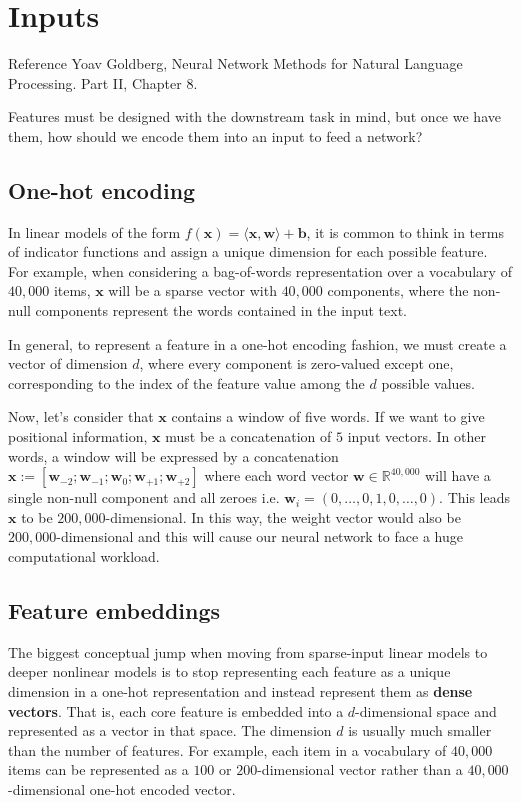 \chapter{Inputs}

\begin{note}{Reference}
    Yoav Goldberg, Neural Network Methods for Natural Language Processing.\cite{goldberg2017neural}
    Part II, Chapter 8.
\end{note}

Features must be designed with the downstream task in mind, but once we have them, how should we encode them into an input to feed a network?

\section{One-hot encoding}
In linear models of the form
\( f(\mathbf{x}) = \langle \mathbf{x}, \mathbf{w} \rangle + \mathbf{b} \),
it is common to think in terms of indicator functions and assign a unique dimension for each possible feature.
For example, when considering a bag-of-words representation over a vocabulary of \( 40{,}000 \) items, \(\mathbf{x}\) will be a sparse vector with \( 40{,}000 \) components, where the non-null components represent the words contained in the input text.

In general, to represent a feature in a one-hot encoding fashion, we must create a vector of dimension \(d\), where every component is zero-valued except one, corresponding to the index of the feature value among the \(d\) possible values.

Now, let's consider that \(\mathbf{x}\) contains a window of five words.
If we want to give positional information, \(\mathbf{x}\) must be a concatenation of \(5\) input vectors. 
In other words, a window will be expressed by a concatenation \(\mathbf{x}:=[\mathbf{w}_{-2}; \mathbf{w}_{-1}; \mathbf{w}_{0}; \mathbf{w}_{+1}; \mathbf{w}_{+2}]\) where each word vector \(\mathbf{w} \in \mathbb{R}^{40{,}000}\) will have a single non-null component and all zeroes i.e. \(\mathbf{w}_{i}=(0,\ldots,0,1,0,\ldots,0)\).
This leads \(\mathbf{x}\) to be \(200{,}000\)-dimensional. 
In this way, the weight vector would also be \(200{,}000\)-dimensional and this will cause our neural network to face a huge computational workload.

\section{Feature embeddings}
The biggest conceptual jump when moving from sparse-input linear models to deeper nonlinear models is to stop representing each feature as a unique dimension in a one-hot representation and instead represent them as \textbf{dense vectors}. That is, each core feature is embedded into a \(d\)-dimensional space and represented as a vector in that space. The dimension \(d\) is usually much smaller than the number of features. For example, each item in a vocabulary of \(40{,}000\) items can be represented as a \(100\) or \(200\)-dimensional vector rather than a \(40{,}000\)-dimensional one-hot encoded vector.

